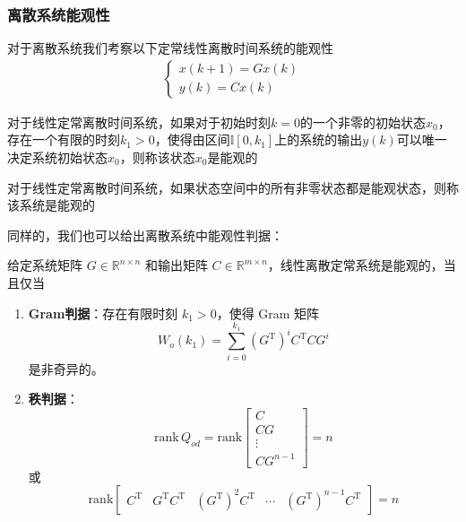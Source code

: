 \subsubsection{离散系统能观性}

对于离散系统我们考察以下定常线性离散时间系统的能观性
\begin{gather*}
    \begin{cases}
        x(k+1) = G x(k) \\
        y(k) = C x(k)
    \end{cases}
\end{gather*}

\begin{definition}[能观状态]
    对于线性定常离散时间系统，如果对于初始时刻$k = 0$的一个非零的初始状态$x_0$，存在一个有限的时刻$k_1 > 0$，使得由区间$\mathbb{I}[0,k_1]$上的系统的输出$y(k)$可以唯一决定系统初始状态$x_0$，则称该状态$x_0$是能观的
\end{definition}

\begin{definition}[系统的能观性]
    对于线性定常离散时间系统，如果状态空间中的所有非零状态都是能观状态，则称该系统是能观的
\end{definition}

同样的，我们也可以给出离散系统中能观性判据：
\begin{anymark}[离散系统能观性Gram判据与秩判据]
    给定系统矩阵 $G \in \mathbb{R}^{n \times n}$ 和输出矩阵 $C \in \mathbb{R}^{m \times n}$，线性离散定常系统是能观的，当且仅当
    \begin{enumerate}
        \item \textbf{Gram判据}：存在有限时刻 $k_1 > 0$，使得 Gram 矩阵
        \begin{equation*}
            W_o(k_1) = \sum_{i=0}^{k_1} (G^{\mathrm{T}})^i C^{\mathrm{T}} C G^i
        \end{equation*}
        是非奇异的。
        \item \textbf{秩判据}：
        \begin{equation*}
            \mathrm{rank}\, Q_{od} = \mathrm{rank}
            \begin{bmatrix}
            C \\ CG \\ \vdots \\ CG^{n-1}
            \end{bmatrix} = n
        \end{equation*}
        或
        \begin{equation*}
            \mathrm{rank}
            \begin{bmatrix}
            C^{\mathrm{T}} & G^{\mathrm{T}}C^{\mathrm{T}} & (G^{\mathrm{T}})^2 C^{\mathrm{T}} & \cdots & (G^{\mathrm{T}})^{n-1} C^{\mathrm{T}}
            \end{bmatrix} = n
        \end{equation*}
    \end{enumerate}
\end{anymark}


